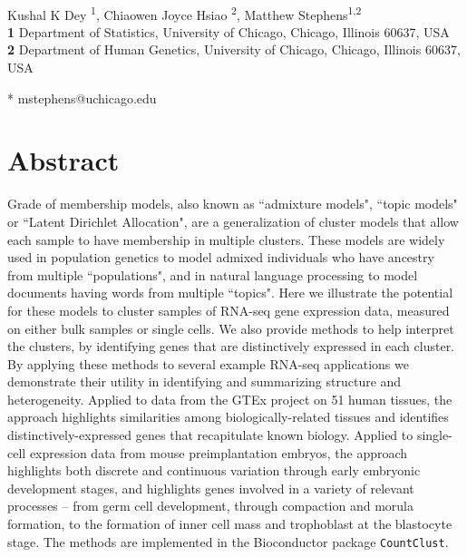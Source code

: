 \documentclass[10pt,letterpaper]{article}
\begin{document}
\vspace*{0.2in}

\begin{flushleft}
{\Large
\textbf{}
}
\newline
\\
Kushal K Dey \textsuperscript{1},
Chiaowen Joyce Hsiao \textsuperscript{2},
Matthew Stephens\textsuperscript{1,2}
\\
\bigskip
\textbf{1} Department of Statistics, University of Chicago, Chicago, Illinois 60637, USA
\\
\textbf{2} Department of Human Genetics, University of Chicago, Chicago, Illinois 60637, USA
\\
\bigskip

* mstephens@uchicago.edu

\end{flushleft}


\section*{Abstract}
Grade of membership models, also known as ``admixture models", ``topic models" or ``Latent Dirichlet Allocation",
are a generalization of cluster models that allow each sample to have membership in multiple clusters.
These models are widely used in population genetics to model admixed individuals who have ancestry from multiple ``populations",
and in natural language processing to model documents having words from multiple ``topics". Here we illustrate the potential for these models
to cluster samples of RNA-seq gene expression data, measured on either bulk samples or single cells.
We also provide methods to help interpret the clusters, by identifying genes that are distinctively expressed in each cluster.
By applying these methods to several example RNA-seq applications we demonstrate their utility in
identifying and summarizing structure and heterogeneity. Applied to
data from the GTEx project on 51 human tissues, the approach highlights similarities among biologically-related tissues and
identifies distinctively-expressed genes that recapitulate known biology.  Applied to single-cell expression data from
mouse preimplantation embryos, the approach highlights both discrete and continuous variation through early embryonic development stages,
and highlights genes involved in a variety of relevant processes -- from germ cell development, through compaction and morula formation, to
the formation of inner cell mass and trophoblast at the blastocyte stage.
The methods are implemented in the Bioconductor package {\tt CountClust}.
\end{document}
